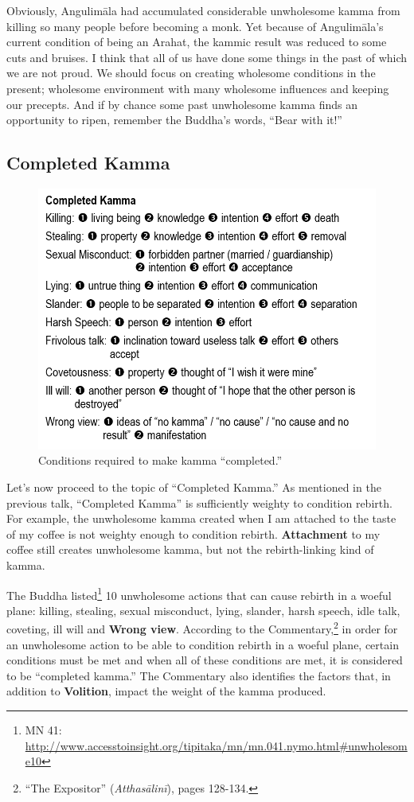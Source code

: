 Obviously, Angulimāla had accumulated considerable unwholesome kamma from killing so many people before becoming a monk. Yet because of Angulimāla’s current condition of being an Arahat, the kammic result was reduced to some cuts and bruises. I think that all of us have done some things in the past of which we are not proud. We should focus on creating wholesome conditions in the present; wholesome environment with many wholesome influences and keeping our precepts. And if by chance some past unwholesome kamma finds an opportunity to ripen, remember the Buddha’s words, “Bear with it!”

\subsection*{Completed Kamma}

\begin{figure}[h]
\centering
\includegraphics[width=0.7\linewidth]{./Diagrams/Completed}
\caption{Conditions required to make kamma “completed.”}
\label{fig:Completed}
\end{figure}

Let’s now proceed to the topic of “Completed Kamma.” As mentioned in the previous talk, “Completed Kamma” is sufficiently weighty to condition rebirth. For example, the unwholesome kamma created when I am attached to the taste of my coffee is not weighty enough to condition rebirth. \textbf{Attachment} to my coffee still creates unwholesome kamma, but not the rebirth-linking kind of kamma.

The Buddha listed\footnote{MN 41: \url{http://www.accesstoinsight.org/tipitaka/mn/mn.041.nymo.html\#unwholesome10}} 10 unwholesome actions that can cause rebirth in a woeful plane: killing, stealing, sexual misconduct, lying, slander, harsh speech, idle talk, coveting, ill will and \textbf{Wrong view}. According to the Commentary,\footnote{“The Expositor” (\textit{Atthasālinī}), pages 128-134.} in order for an unwholesome action to be able to condition rebirth in a woeful plane, certain conditions must be met and when all of these conditions are met, it is considered to be “completed kamma.” The Commentary also identifies the factors that, in addition to \textbf{Volition}, impact the weight of the kamma produced. 

